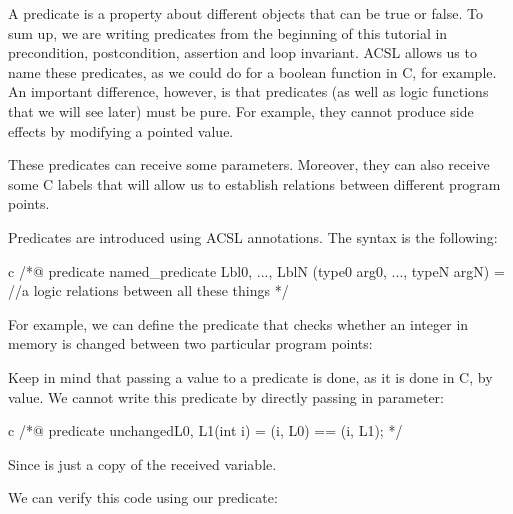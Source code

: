 A predicate is a property about different objects that can be true or
false. To sum up, we are writing predicates from the beginning of this
tutorial in precondition, postcondition, assertion and loop invariant.
ACSL allows us to name these predicates, as we could do for a boolean
function in C, for example. An important difference, however, is that
predicates (as well as logic functions that we will see later) must be pure.
For example, they cannot produce side effects by modifying a pointed
value.

These predicates can receive some parameters. Moreover, they can also
receive some C labels that will allow us to establish relations between
different program points.





Predicates are introduced using ACSL annotations. The syntax is the
following:



\begin{CodeBlock}{c}
/*@
  predicate named_predicate { Lbl0, ..., LblN }(type0 arg0, ..., typeN argN) =
    //a logic relations between all these things
*/
\end{CodeBlock}



For example, we can define the predicate that checks whether an integer
in memory is changed between two particular program points:






\begin{Warning}
  Keep in mind that passing a value to a predicate is done, as it is done in C,
  by value. We cannot write this predicate by directly passing  in
  parameter:

\begin{CodeBlock}{c}
/*@
  predicate unchanged{L0, L1}(int i) =
    \at(i, L0) == \at(i, L1);
 */
\end{CodeBlock}

  Since  is just a copy of the received variable.
\end{Warning}


We can verify this code using our predicate:






